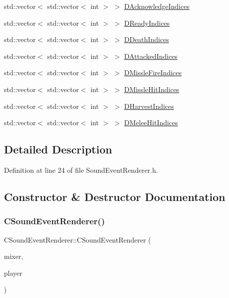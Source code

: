 \begin{DoxyCompactItemize}
std\+::vector$<$ std\+::vector$<$ int $>$ $>$ \hyperlink{classCSoundEventRenderer_ad52a927e172ab9a00dbf1f707e1fb724}{D\+Acknowledge\+Indices}
\item 
std\+::vector$<$ std\+::vector$<$ int $>$ $>$ \hyperlink{classCSoundEventRenderer_a68d2be3282880d4d7b47ee94b0a30139}{D\+Ready\+Indices}
\item 
std\+::vector$<$ std\+::vector$<$ int $>$ $>$ \hyperlink{classCSoundEventRenderer_a6b250e51c42870715c12ea47b99b9594}{D\+Death\+Indices}
\item 
std\+::vector$<$ std\+::vector$<$ int $>$ $>$ \hyperlink{classCSoundEventRenderer_a5ffc7dd4911c09c23987c6d1a8776c26}{D\+Attacked\+Indices}
\item 
std\+::vector$<$ std\+::vector$<$ int $>$ $>$ \hyperlink{classCSoundEventRenderer_ab781b03b940441c7d23fe1d6031d773e}{D\+Missle\+Fire\+Indices}
\item 
std\+::vector$<$ std\+::vector$<$ int $>$ $>$ \hyperlink{classCSoundEventRenderer_aa551953be1c1e7926432996c78c6d8d8}{D\+Missle\+Hit\+Indices}
\item 
std\+::vector$<$ std\+::vector$<$ int $>$ $>$ \hyperlink{classCSoundEventRenderer_abe64071cbc49cffab8a5c6160b7f821d}{D\+Harvest\+Indices}
\item 
std\+::vector$<$ std\+::vector$<$ int $>$ $>$ \hyperlink{classCSoundEventRenderer_a54a3a8f6a91adcaa81faa779772622da}{D\+Melee\+Hit\+Indices}
\end{DoxyCompactItemize}


\subsection{Detailed Description}


Definition at line 24 of file Sound\+Event\+Renderer.\+h.



\subsection{Constructor \& Destructor Documentation}
\hypertarget{classCSoundEventRenderer_a2a1c105a120bebf386b772a06c2a053a}{}\label{classCSoundEventRenderer_a2a1c105a120bebf386b772a06c2a053a} 
\subsubsection{\texorpdfstring{C\+Sound\+Event\+Renderer()}{CSoundEventRenderer()}}
{\footnotesize\ttfamily C\+Sound\+Event\+Renderer\+::\+C\+Sound\+Event\+Renderer (\begin{DoxyParamCaption}\item[{std\+::shared\+\_\+ptr$<$ \hyperlink{classCSoundLibraryMixer}{C\+Sound\+Library\+Mixer} $>$}]{mixer,  }\item[{std\+::shared\+\_\+ptr$<$ \hyperlink{classCPlayerData}{C\+Player\+Data} $>$}]{player }\end{DoxyParamCaption})}



